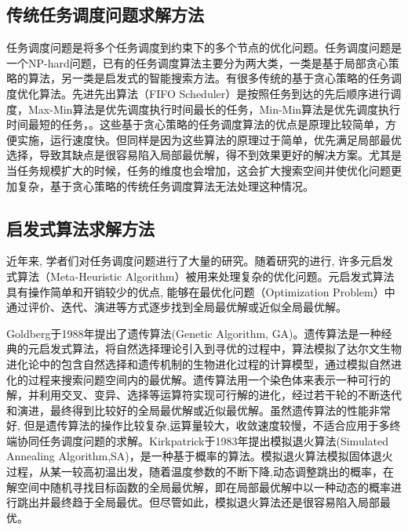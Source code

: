 \subsection{传统任务调度问题求解方法}

任务调度问题是将多个任务调度到约束下的多个节点的优化问题。任务调度问题是一个NP-hard问题\cite{tawfeek2013cloud}，已有的任务调度算法主要分为两大类，一类是基于局部贪心策略的算法，另一类是启发式的智能搜索方法。有很多传统的基于贪心策略的任务调度优化算法\cite{乔楠楠2017一种面向网络边缘任务调度问题的多方向粒子群优化算法}。先进先出算法（FIFO Scheduler）是按照任务到达的先后顺序进行调度\cite{zaharia2009job}，Max-Min算法是优先调度执行时间最长的任务，Min-Min算法是优先调度执行时间最短的任务，\cite{tabak2014improving,杜玉霞2010Min}。这些基于贪心策略的任务调度算法的优点是原理比较简单，方便实施，运行速度快。但同样是因为这些算法的原理过于简单，优先满足局部最优选择，导致其缺点是很容易陷入局部最优解，得不到效果更好的解决方案。尤其是当任务规模扩大的时候，任务的维度也会增加，这会扩大搜索空间并使优化问题更加复杂，基于贪心策略的传统任务调度算法无法处理这种情况。


\subsection{启发式算法求解方法}

近年来, 学者们对任务调度问题进行了大量的研究。随着研究的进行, 许多元启发式算法（Meta-Heuristic Algorithm）被用来处理复杂的优化问题。元启发式算法具有操作简单和开销较少的优点, 能够在最优化问题（Optimization Problem）中通过评价、迭代、演进等方式逐步找到全局最优解或近似全局最优解。

Goldberg于1988年提出了遗传算法(Genetic Algorithm, GA)\cite{whitley1994genetic}。遗传算法是一种经典的元启发式算法，将自然选择理论引入到寻优的过程中，算法模拟了达尔文生物进化论中的包含自然选择和遗传机制的生物进化过程的计算模型，通过模拟自然进化的过程来搜索问题空间内的最优解。遗传算法用一个染色体来表示一种可行的解，并利用交叉、变异、选择等运算符实现可行解的进化，经过若干轮的不断迭代和演进，最终得到比较好的全局最优解或近似最优解。虽然遗传算法的性能非常好, 但是遗传算法的操作比较复杂,运算量较大，收敛速度较慢，不适合应用于多终端协同任务调度问题的求解。Kirkpatrick于1983年提出模拟退火算法(Simulated Annealing Algorithm,SA)，是一种基于概率的算法。模拟退火算法模拟固体退火过程，从某一较高初温出发，随着温度参数的不断下降,动态调整跳出的概率，在解空间中随机寻找目标函数的全局最优解，即在局部最优解中以一种动态的概率进行跳出并最终趋于全局最优\cite{rutenbar1989simulated}。但尽管如此，模拟退火算法还是很容易陷入局部最优。

